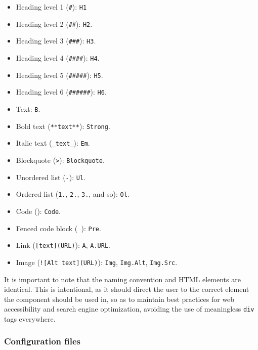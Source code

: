 \begin{itemize}
    \item
    Heading level 1 (\texttt{\#}): \texttt{H1}
    \item
    Heading level 2 (\texttt{\#\#}): \texttt{H2}.
    \item
    Heading level 3 (\texttt{\#\#\#}): \texttt{H3}.
    \item
    Heading level 4 (\texttt{\#\#\#\#}): \texttt{H4}.
    \item
    Heading level 5 (\texttt{\#\#\#\#\#}): \texttt{H5}.
    \item
    Heading level 6 (\texttt{\#\#\#\#\#\#}): \texttt{H6}.
    \item
    Text: \texttt{B}.
    \item
    Bold text (\texttt{**text**}): \texttt{Strong}.
    \item
    Italic text (\texttt{\_text\_}): \texttt{Em}.
    \item
    Blockquote (\texttt{\textgreater{}}): \texttt{Blockquote}.
    \item
    Unordered list (\texttt{-}): \texttt{Ul}.
    \item
    Ordered list (\texttt{1.}, \texttt{2.}, \texttt{3.}, and so):
    \texttt{Ol}.
    \item
    Code (\texttt{\textasciigrave{}\textasciigrave{}}): \texttt{Code}.
    \item
    Fenced code block
    (\texttt{\textasciigrave{}\textasciigrave{}\textasciigrave{}\ \textasciigrave{}\textasciigrave{}\textasciigrave{}}):
    \texttt{Pre}.
    \item
    Link (\texttt{{[}text{]}(URL)}): \texttt{A}, \texttt{A.URL}.
    \item
    Image (\texttt{!{[}Alt\ text{]}(URL)}): \texttt{Img},
    \texttt{Img.Alt}, \texttt{Img.Src}.
\end{itemize}

It is important to note that the naming convention and HTML elements are
identical. This is intentional, as it should direct the user to the
correct element the component should be used in, so as to maintain best
practices for web accessibility and search engine optimization, avoiding
the use of meaningless \texttt{div} tags everywhere.

\subsubsection{Configuration files}\label{subsubsec:configuration-files}

